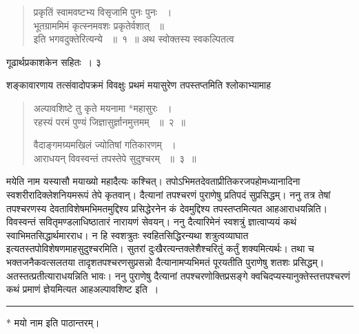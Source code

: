 \documentclass[11pt, openany]{book}
\begin{document}
\begin{quote}
{\ssi प्रकृतिं स्वामवष्टभ्य विसृजामि पुनः पुनः ~।\\
भूतग्राममिमं कृत्स्नमवशः प्रकृतेर्वशात् ~॥\\
इति भगवदुक्तेरित्यन्ये ~॥~१~॥} अथ स्वोक्तस्य स्वकल्पितत्व\textendash
\end{quote}

\newpage


\hspace{3cm} गूढार्थप्रकाशकेन सहितः~। \hfill ३
\vspace{1cm}
 
\noindent शङ्कावारणाय तत्संवादोपक्रमं विवक्षुः प्रथमं मयासुरेण तपस्तप्तमिति श्लोकाभ्यामाह\textendash


\begin{quote}
{\ssi अल्पावशिष्टे तु कृते मयनामा *महासुरः ~।\\
रहस्यं परमं पुण्यं जिज्ञासुर्ज्ञानमुत्तमम् ~॥~२~॥

वैदाङ्गमग्र्यमखिलं ज्योतिषां गतिकारणम् ~।\\
आराधयन् विवस्वन्तं तपस्तेपे सुदुश्चरम् ~॥~३~॥}
\end{quote}

\begin{sloppypar}
 मयेति नाम यस्यासौ मयाख्यो महादैत्यः कश्चित्। तपोऽभिमतदेवताप्रीतिकरजपहोमध्यानादिना स्वशरीरादिक्लेशनियमरूपं तेपे कृतवान्। दैत्यानां तपश्चरणं पुराणेषु प्रतिपदं सुप्रसिद्धम्। ननु तत्र तेषां तपश्चरणस्य देवताविशेषमभिमतमुद्दिश्य प्रसिद्धेरनेन कं देवमुद्दिश्य तपस्तप्तमित्यत आह\textendash आराधयन्निति। विवस्वन्तं सवितृमण्डलाधिष्ठातारं नारायणं सेवयन्। ननु दैत्यारिमेनं स्वशत्रुं ज्ञात्वाप्ययं कथं स्वाभिमतसिद्धार्थमारराध। न हि स्वशत्रुतः स्वहितसिद्धिरन्यथा शत्रुत्वव्याघात इत्यतस्तपोविशेषणमाह\textendash सुदुश्चरमिति। सुतरां दुःखैरत्यन्तक्लेशैश्चरितुं कर्तुं शक्यमित्यर्थः। तथा च भक्तजनैकवत्सलतया तादृशतपश्चरणसुप्रसन्नो दैत्यानामप्यभिमतं पूरयतीति पुराणेषु शतशः प्रसिद्धम्। अतस्तत्प्रतीत्याराधयन्निति भावः। ननु पुराणेषु दैत्यानां तपश्चरणोक्तिप्रसङ्गे क्वचिदप्यस्यानुक्तेस्तत्तपश्चरणं कथं प्रमाणं ज्ञेयमित्यत आह\textendash अल्पावशिष्ट इति~।
\end{sloppypar}

\noindent\rule{\linewidth}{.5pt}

\begin{center}
* मयो नाम इति पाठान्तरम्।
\end{center}
 
\end{document}
